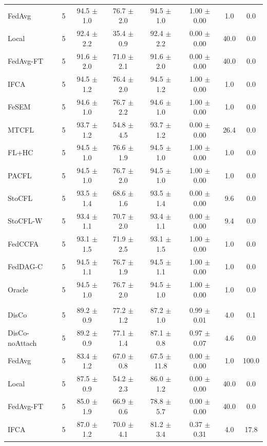 {\begin{tabular}{l r c c c c c c}
FedAvg & 5 & 94.5 $\pm$ 1.0 & 76.7 $\pm$ 2.0 & 94.5 $\pm$ 1.0 & 1.00 $\pm$ 0.00 & 1.0 & 0.0 \\
Local & 5 & 92.4 $\pm$ 2.2 & 35.4 $\pm$ 0.9 & 92.4 $\pm$ 2.2 & 0.00 $\pm$ 0.00 & 40.0 & 0.0 \\
FedAvg-FT & 5 & 91.6 $\pm$ 2.0 & 71.0 $\pm$ 2.1 & 91.6 $\pm$ 2.0 & 0.00 $\pm$ 0.00 & 40.0 & 0.0 \\
IFCA & 5 & 94.5 $\pm$ 1.2 & 76.4 $\pm$ 2.0 & 94.5 $\pm$ 1.2 & 1.00 $\pm$ 0.00 & 1.0 & 0.0 \\
FeSEM & 5 & 94.6 $\pm$ 1.0 & 76.7 $\pm$ 2.2 & 94.6 $\pm$ 1.0 & 1.00 $\pm$ 0.00 & 1.0 & 0.0 \\
MTCFL & 5 & 93.7 $\pm$ 1.2 & 54.8 $\pm$ 4.5 & 93.7 $\pm$ 1.2 & 0.00 $\pm$ 0.00 & 26.4 & 0.0 \\
FL+HC & 5 & 94.5 $\pm$ 1.0 & 76.6 $\pm$ 1.9 & 94.5 $\pm$ 1.0 & 1.00 $\pm$ 0.00 & 1.0 & 0.0 \\
PACFL & 5 & 94.5 $\pm$ 1.0 & 76.7 $\pm$ 2.0 & 94.5 $\pm$ 1.0 & 1.00 $\pm$ 0.00 & 1.0 & 0.0 \\
StoCFL & 5 & 93.5 $\pm$ 1.4 & 68.6 $\pm$ 1.6 & 93.5 $\pm$ 1.4 & 0.00 $\pm$ 0.00 & 9.6 & 0.0 \\
StoCFL-W & 5 & 93.4 $\pm$ 1.1 & 70.7 $\pm$ 2.0 & 93.4 $\pm$ 1.1 & 0.00 $\pm$ 0.00 & 9.4 & 0.0 \\
FedCCFA & 5 & 93.1 $\pm$ 1.5 & 71.9 $\pm$ 2.5 & 93.1 $\pm$ 1.5 & 1.00 $\pm$ 0.00 & 1.0 & 0.0 \\
FedDAG-C & 5 & 94.5 $\pm$ 1.1 & 76.7 $\pm$ 1.9 & 94.5 $\pm$ 1.1 & 1.00 $\pm$ 0.00 & 1.0 & 0.0 \\
Oracle & 5 & 94.5 $\pm$ 1.0 & 76.7 $\pm$ 2.0 & 94.5 $\pm$ 1.0 & 1.00 $\pm$ 0.00 & 1.0 & 0.0 \\
\addlinespace
\multicolumn{8}{l}{\textit{Minority groups}} \\
DisCo & 5 & 89.2 $\pm$ 0.9 & 77.2 $\pm$ 1.2 & 87.2 $\pm$ 1.0 & 0.99 $\pm$ 0.01 & 4.0 & 0.1 \\
DisCo-noAttach & 5 & 89.2 $\pm$ 0.9 & 77.1 $\pm$ 1.4 & 87.1 $\pm$ 0.8 & 0.97 $\pm$ 0.07 & 4.6 & 0.0 \\
FedAvg & 5 & 83.4 $\pm$ 1.2 & 67.0 $\pm$ 0.8 & 67.5 $\pm$ 11.8 & 0.00 $\pm$ 0.00 & 1.0 & 100.0 \\
Local & 5 & 87.5 $\pm$ 0.9 & 54.2 $\pm$ 2.3 & 86.0 $\pm$ 1.2 & 0.00 $\pm$ 0.00 & 40.0 & 0.0 \\
FedAvg-FT & 5 & 85.0 $\pm$ 1.9 & 66.9 $\pm$ 0.6 & 78.8 $\pm$ 5.7 & 0.00 $\pm$ 0.00 & 40.0 & 0.0 \\
IFCA & 5 & 87.0 $\pm$ 1.2 & 70.0 $\pm$ 4.1 & 81.2 $\pm$ 3.4 & 0.37 $\pm$ 0.31 & 4.0 & 17.8 \\

\end{tabular}}
